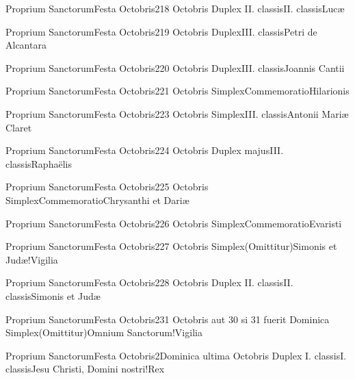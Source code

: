 \documentclass[invitatoriale-romanum.tex]{subfiles}
\begin{document}
	{Proprium Sanctorum}{Festa Octobris}{2}{18 Octobris}
	{Duplex II. classis}{II. classis}{Lucæ}
	{}
	{}

	{Proprium Sanctorum}{Festa Octobris}{2}{19 Octobris}
	{Duplex}{III. classis}{Petri de Alcantara}
	{}
	{}

	{Proprium Sanctorum}{Festa Octobris}{2}{20 Octobris}
	{Duplex}{III. classis}{Joannis Cantii}
	{}
	{}

	{Proprium Sanctorum}{Festa Octobris}{2}{21 Octobris}
	{Simplex}{Commemoratio}{Hilarionis}
	{}
	{\invitferia}

	{Proprium Sanctorum}{Festa Octobris}{2}{23 Octobris}
	{Simplex}{III. classis}{Antonii Mariæ Claret}
	{}
	{}

	{Proprium Sanctorum}{Festa Octobris}{2}{24 Octobris}
	{Duplex majus}{III. classis}{Raphaëlis}
	{}
	{}

	{Proprium Sanctorum}{Festa Octobris}{2}{25 Octobris}
	{Simplex}{Commemoratio}{Chrysanthi et Dariæ}
	{}
	{\invitferia}

	{Proprium Sanctorum}{Festa Octobris}{2}{26 Octobris}
	{Simplex}{Commemoratio}{Evaristi}
	{}
	{\invitferia}

	{Proprium Sanctorum}{Festa Octobris}{2}{27 Octobris}
	{Simplex}{(Omittitur)}{Simonis et Judæ!Vigilia}
	{}
	{}
\invitferia

	{Proprium Sanctorum}{Festa Octobris}{2}{28 Octobris}
	{Duplex II. classis}{II. classis}{Simonis et Judæ}
	{}
	{}

	{Proprium Sanctorum}{Festa Octobris}{2}{31 Octobris aut 30 si 31 fuerit Dominica}
	{Simplex}{(Omittitur)}{Omnium Sanctorum!Vigilia}
	{}
	{}
\invitferia

	{Proprium Sanctorum}{Festa Octobris}{2}{Dominica ultima Octobris}
	{Duplex I. classis}{I. classis}{Jesu Christi, Domini nostri!Rex}
	{}
	{}
\end{document}
